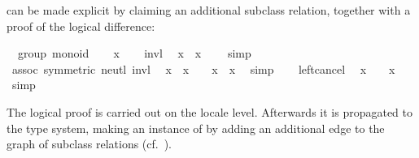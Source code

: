 \begin{isabellebody}
\begin{isamarkuptext}
  can be made explicit by claiming an additional
  subclass relation,
  together with a proof of the logical difference:%
\end{isamarkuptext}%
\isamarkuptrue%
%
\isadelimquote
%
\endisadelimquote
%
\isatagquote
{}\isamarkupfalse%
\ {\isacharparenleft}\ group{\isacharparenright}\ monoid\isanewline
{}\isamarkupfalse%
\isanewline
\ \ \isamarkupfalse%
\ x\isanewline
\ \ \isamarkupfalse%
\ invl\ \isamarkupfalse%
\ {\isachardoublequoteopen}x{\isasymdiv}\ {\isasymotimes}\ x\ {\isacharequal}\ {\isasymone}{\isachardoublequoteclose}\ \isamarkupfalse%
\ simp\isanewline
\ \ \isamarkupfalse%
\ assoc\ {\isacharbrackleft}symmetric{\isacharbrackright}\ neutl\ invl\ \isamarkupfalse%
\ {\isachardoublequoteopen}x{\isasymdiv}\ {\isasymotimes}\ {\isacharparenleft}x\ {\isasymotimes}\ {\isasymone}{\isacharparenright}\ {\isacharequal}\ x{\isasymdiv}\ {\isasymotimes}\ x{\isachardoublequoteclose}\ \isamarkupfalse%
\ simp\isanewline
\ \ \isamarkupfalse%
\ left{\isacharunderscore}cancel\ \isamarkupfalse%
\ {\isachardoublequoteopen}x\ {\isasymotimes}\ {\isasymone}\ {\isacharequal}\ x{\isachardoublequoteclose}\ \isamarkupfalse%
\ simp\isanewline
{}\isamarkupfalse%
%
\endisatagquote
{\isafoldquote}%
%
\isadelimquote
%
\endisadelimquote
%
\begin{isamarkuptext}%
\noindent The logical proof is carried out on the locale level.
  Afterwards it is propagated
  to the type system, making  an instance of
   by adding an additional edge
  to the graph of subclass relations
  (cf.\ ).


\end{isamarkuptext}
\end{isabellebody}
